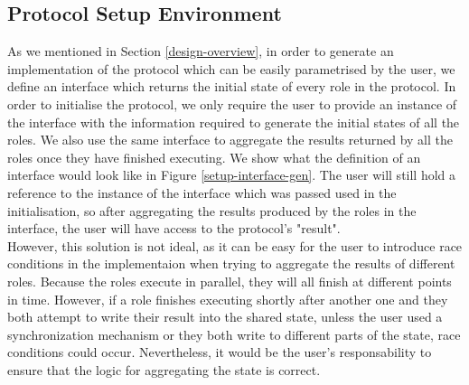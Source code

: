 \documentclass[12pt,twoside]{report}
\begin{document}
\subsection{Protocol Setup Environment}

As we mentioned in Section \ref{design-overview}, in order to generate an implementation of the protocol which can be easily parametrised by the user, we define an interface which returns the initial state of every role in the protocol. In order to initialise the protocol, we only require the user to provide an instance of the interface with the information required to generate the initial states of all the roles. We also use the same interface to aggregate the results returned by all the roles once they have finished executing. We show what the definition of an interface would look like in Figure \ref{setup-interface-gen}. The user will still hold a reference to the instance of the interface which was passed used in the initialisation, so after aggregating the results produced by the roles in the interface, the user will have access to the protocol's "result".\\

However, this solution is not ideal, as it can be easy for the user to introduce race conditions in the implementaion when trying to aggregate the results of different roles. Because the roles execute in parallel, they will all finish at different points in time. However, if a role finishes executing shortly after another one and they both attempt to write their result into the shared state, unless the user used a synchronization mechanism or they both write to different parts of the state, race conditions could occur. Nevertheless, it would be the user's responsability to ensure that the logic for aggregating the state is correct.
\end{document}
